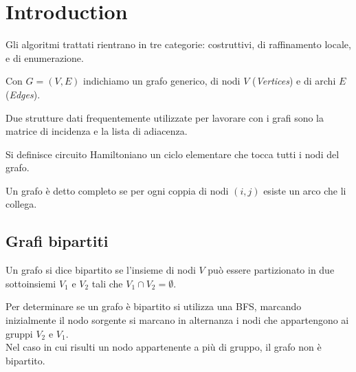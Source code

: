 \documentclass[../template]{subfiles}
\begin{document}
\section{Introduction}
Gli algoritmi trattati rientrano in tre categorie: costruttivi, di raffinamento locale, e di enumerazione.

Con $G=(V, E)$ indichiamo un grafo generico, di nodi $V$ (\textit{Vertices}) e di archi $E$ (\textit{Edges}).

Due strutture dati frequentemente utilizzate per lavorare con i grafi sono la matrice di incidenza e la lista di adiacenza.

Si definisce circuito Hamiltoniano un ciclo elementare che tocca tutti i nodi del grafo.

Un grafo è detto completo se per ogni coppia di nodi $(i, j)$ esiste un arco che li collega.
\subsection{Grafi bipartiti}
Un grafo si dice bipartito se l'insieme di nodi $V$ può essere partizionato in due sottoinsiemi $V_1$ e $V_2$ tali che $V_1 \cap V_2 = \emptyset$.

Per determinare se un grafo è bipartito si utilizza una BFS, marcando inizialmente il nodo sorgente si marcano in alternanza i nodi che appartengono ai gruppi $V_2$ e $V_1$.
\\
Nel caso in cui risulti un nodo appartenente a più di gruppo, il grafo non è bipartito.


\end{document}

